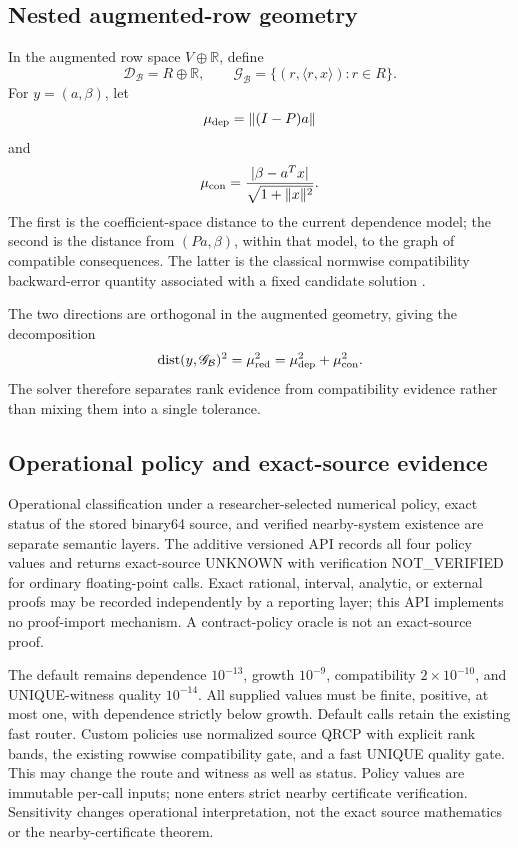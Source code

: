 \documentclass[11pt]{article}
\theoremstyle{definition}
\newcommand{\R}{\mathbb{R}}
\newcommand{\Bun}{\mathcal{B}}
\newcommand{\cD}{\mathscr D}
\newcommand{\cG}{\mathscr G}
\begin{document}
\subsection{Nested augmented-row geometry}
In the augmented row space \(V\oplus\R\), define
\[
\cD_\Bun=R\oplus\R,
\qquad
\cG_\Bun=\{(r,\langle r,x\rangle):r\in R\}.
\]
For \(y=(a,\beta)\), let
\[
\mu_{\rm dep}=\|(I-P)a\|
\]
and
\[
\mu_{\rm con}=\frac{|\beta-a^Tx|}{\sqrt{1+\|x\|^2}}.
\]
The first is the coefficient-space distance to the current dependence model; the second is the distance from $(Pa,\beta)$, within that model, to the graph of compatible consequences. The latter is the classical normwise compatibility backward-error quantity associated with a fixed candidate solution \citep{RigalGaches1967}.

The two directions are orthogonal in the augmented geometry, giving the decomposition
\[
\operatorname{dist}(y,\cG_\Bun)^2=\mu_{\rm red}^2=\mu_{\rm dep}^2+\mu_{\rm con}^2.
\]
The solver therefore separates rank evidence from compatibility evidence rather than mixing them into a single tolerance.

\subsection{Operational policy and exact-source evidence}
Operational classification under a researcher-selected numerical policy, exact
status of the stored binary64 source, and verified nearby-system existence are
separate semantic layers. The additive versioned API records all four policy
values and returns exact-source UNKNOWN with verification NOT\_VERIFIED for
ordinary floating-point calls. Exact rational, interval, analytic, or external
proofs may be recorded independently by a reporting layer; this API implements
no proof-import mechanism. A contract-policy oracle is not an exact-source proof.

The default remains dependence $10^{-13}$, growth $10^{-9}$, compatibility
$2\times10^{-10}$, and UNIQUE-witness quality $10^{-14}$. All supplied values
must be finite, positive, at most one, with dependence strictly below growth.
Default calls retain the existing fast router. Custom policies use normalized
source QRCP with explicit rank bands, the existing rowwise compatibility gate,
and a fast UNIQUE quality gate. This may change the route and witness as well as
status. Policy values are immutable per-call inputs; none enters strict nearby
certificate verification. Sensitivity changes operational interpretation, not the
exact source mathematics or the nearby-certificate theorem.
\end{document}
